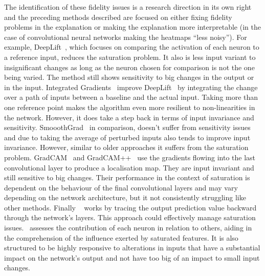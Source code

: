 The identification of these fidelity issues is a research direction in its own right~\cite{KindermansHAASDEK19, DombrowskiAAAMK19, GhorbaniAZ19} and the preceding methods described are focused on either fixing fidelity problems in the explanation or making the explanation more interpretable (\eg in the case of convolutional neural networks making the heatmaps ``less noisy''). For example, DeepLift~\cite{ShrikumarGK17}, which focuses on comparing the activation of each neuron to a reference input, reduces the saturation problem. It also is less input variant to insignificant changes as long as the neuron chosen for comparison is not the one being varied. The method still shows sensitivity to big changes in the output or in the input. Integrated Gradients~\cite{SundararajanTY17} improve DeepLift~\cite{ShrikumarGK17} by integrating the change over a path of inputs between a baseline and the actual input. Taking more than one reference point makes the algorithm even more resilient to non-linearities in the network. However, it does take a step back in terms of input invariance and sensitivity. SmooothGrad~\cite{SmilkovTKVW17} in comparison, doesn't suffer from sensitivity issues and due to taking the average of perturbed inputs also tends to improve input invariance. However, similar to older approaches it suffers from the saturation problem. GradCAM~\cite{ShrikumarGK17} and GradCAM++~\cite{ChattopadhyaySH18} use the gradients flowing into the last convolutional layer to produce a localisation map. They are input invariant and still sensitive to big changes. Their
performance in the context of saturation is dependent on the behaviour of the final convolutional layers and may vary depending on the network architecture, but it not consistently struggling like other methods. Finally \LRP~\cite{bach2015pixel} works by tracing the output prediction value backward through the network's layers. This approach could effectively manage saturation issues. \LRP\ assesses the contribution of each neuron in relation to others, aiding in the comprehension of the influence exerted by saturated features. It is also structured to be highly responsive to alterations in inputs that have a substantial impact on the network’s output and not have too big of an impact to small input changes. 

